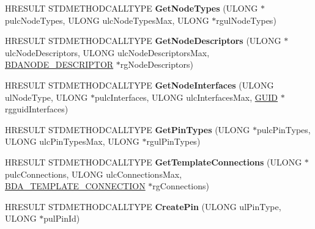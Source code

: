 \begin{DoxyCompactItemize}
H\+R\+E\+S\+U\+LT S\+T\+D\+M\+E\+T\+H\+O\+D\+C\+A\+L\+L\+T\+Y\+PE {\bfseries Get\+Node\+Types} (U\+L\+O\+NG $\ast$pulc\+Node\+Types, U\+L\+O\+NG ulc\+Node\+Types\+Max, U\+L\+O\+NG $\ast$rgul\+Node\+Types)
\item 
\mbox{\label{class_c_b_d_a_device_control_a9a7b5c50517c320366ba0c5a1219c82a}} 
H\+R\+E\+S\+U\+LT S\+T\+D\+M\+E\+T\+H\+O\+D\+C\+A\+L\+L\+T\+Y\+PE {\bfseries Get\+Node\+Descriptors} (U\+L\+O\+NG $\ast$ulc\+Node\+Descriptors, U\+L\+O\+NG ulc\+Node\+Descriptors\+Max, \hyperlink{struct___b_d_a_n_o_d_e___d_e_s_c_r_i_p_t_o_r}{B\+D\+A\+N\+O\+D\+E\+\_\+\+D\+E\+S\+C\+R\+I\+P\+T\+OR} $\ast$rg\+Node\+Descriptors)
\item 
\mbox{\label{class_c_b_d_a_device_control_ae0121be5fd6ae9a354130a6773905574}} 
H\+R\+E\+S\+U\+LT S\+T\+D\+M\+E\+T\+H\+O\+D\+C\+A\+L\+L\+T\+Y\+PE {\bfseries Get\+Node\+Interfaces} (U\+L\+O\+NG ul\+Node\+Type, U\+L\+O\+NG $\ast$pulc\+Interfaces, U\+L\+O\+NG ulc\+Interfaces\+Max, \hyperlink{interface_g_u_i_d}{G\+U\+ID} $\ast$rgguid\+Interfaces)
\item 
\mbox{\label{class_c_b_d_a_device_control_a7d69973b58e0e1041be325ba59d50359}} 
H\+R\+E\+S\+U\+LT S\+T\+D\+M\+E\+T\+H\+O\+D\+C\+A\+L\+L\+T\+Y\+PE {\bfseries Get\+Pin\+Types} (U\+L\+O\+NG $\ast$pulc\+Pin\+Types, U\+L\+O\+NG ulc\+Pin\+Types\+Max, U\+L\+O\+NG $\ast$rgul\+Pin\+Types)
\item 
\mbox{\label{class_c_b_d_a_device_control_a80093d849bfe3eed24baa7710f58ac7f}} 
H\+R\+E\+S\+U\+LT S\+T\+D\+M\+E\+T\+H\+O\+D\+C\+A\+L\+L\+T\+Y\+PE {\bfseries Get\+Template\+Connections} (U\+L\+O\+NG $\ast$pulc\+Connections, U\+L\+O\+NG ulc\+Connections\+Max, \hyperlink{struct___b_d_a___t_e_m_p_l_a_t_e___c_o_n_n_e_c_t_i_o_n}{B\+D\+A\+\_\+\+T\+E\+M\+P\+L\+A\+T\+E\+\_\+\+C\+O\+N\+N\+E\+C\+T\+I\+ON} $\ast$rg\+Connections)
\item 
\mbox{\label{class_c_b_d_a_device_control_ab7d1bdf85284f73561578d0d238c0996}} 
H\+R\+E\+S\+U\+LT S\+T\+D\+M\+E\+T\+H\+O\+D\+C\+A\+L\+L\+T\+Y\+PE {\bfseries Create\+Pin} (U\+L\+O\+NG ul\+Pin\+Type, U\+L\+O\+NG $\ast$pul\+Pin\+Id)
\item 
\mbox{\label{class_c_b_d_a_device_control_ab585b7354f74740a5ff9e2d73815ea4c}} 

\end{DoxyCompactItemize}
